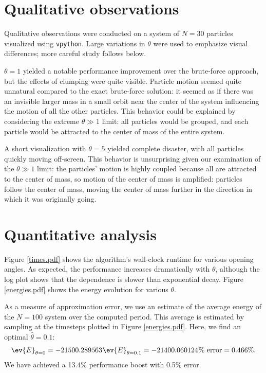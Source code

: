 \documentclass{article}
\begin{document}
\section{Qualitative observations}

Qualitative observations were conducted on a system of $N = 30$ particles
visualized using \texttt{vpython}. Large variations in $\theta$ were used
to emphasize visual differences; more careful study follows below.

$\theta = 1$ yielded a notable performance improvement over the brute-force
approach, but the effects of clumping were quite visible. Particle motion
seemed quite unnatural compared to the exact brute-force solution: it
seemed as if there was an invisible larger mass in a small orbit
near the center of the system influencing the motion of all the other
particles. This behavior could be explained by considering the
extreme $\theta \gg 1$ limit: all particles would be grouped, and each
particle would be attracted to the center of mass of the entire system.

A short visualization with $\theta = 5$ yielded complete disaster, with
all particles quickly moving off-screen. This behavior is
unsurprising given our examination of the $\theta \gg 1$ limit: the
particles' motion is highly coupled because all are attracted to the center
of mass, so motion of the center of mass is amplified: particles follow
the center of mass, moving the center of mass further in the direction in
which it was originally going.

\section{Quantitative analysis}

Figure \ref{times.pdf} shows the algorithm's wall-clock runtime for various
opening angles. As expected, the performance increases dramatically with
$\theta$, although the log plot shows that the dependence is slower than
exponential decay. Figure \ref{energies.pdf} shows the energy evolution
for various $\theta$.



As a measure of approximation error, we use an estimate
of the average energy of the $N = 100$ system over the computed period.
This average is estimated by sampling at the timesteps plotted in
Figure \ref{energies.pdf}. Here, we find an optimal $\hat\theta = 0.1$:
\begin{align}
    \ev{E}_{\theta = 0} = -21500.289563
    \sp{}
    \ev{E}_{\theta = 0.1} = -21400.060124
    \sp{}
    \text{\% error} = 0.466\%.
\end{align}
We have achieved a 13.4\% performance boost with 0.5\% error.
\end{document}
